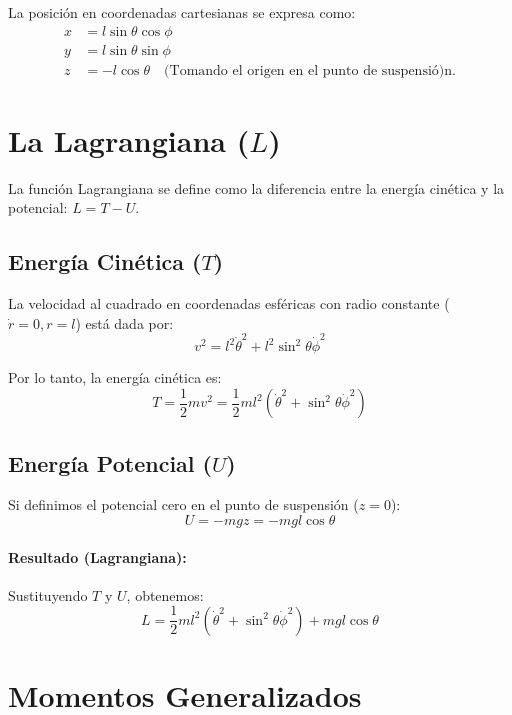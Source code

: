 \documentclass[12pt, a4paper]{article}
\begin{document}
La posición en coordenadas cartesianas se expresa como:
\begin{align}
    x &= l \sin\theta \cos\phi \\
    y &= l \sin\theta \sin\phi \\
    z &= -l \cos\theta \quad \text{(Tomando el origen en el punto de suspensió)n.}
\end{align}

\section*{La Lagrangiana ($L$)}

La función Lagrangiana se define como la diferencia entre la energía cinética y la potencial: $L = T - U$.

\subsection*{Energía Cinética ($T$)}
La velocidad al cuadrado en coordenadas esféricas con radio constante ($\dot{r}=0, r=l$) está dada por:
\begin{equation}
    v^2 = l^2 \dot{\theta}^2 + l^2 \sin^2\theta \dot{\phi}^2
\end{equation}

Por lo tanto, la energía cinética es:
\begin{equation}
    T = \frac{1}{2} m v^2 = \frac{1}{2} m l^2 (\dot{\theta}^2 + \sin^2\theta \dot{\phi}^2)
\end{equation}

\subsection*{Energía Potencial ($U$)}
 Si definimos el potencial cero en el punto de suspensión ($z=0$):
\begin{equation}
    U = -mgz = -mgl \cos\theta
\end{equation}

\paragraph{Resultado (Lagrangiana):}
Sustituyendo $T$ y $U$, obtenemos:
\begin{equation}
    L = \frac{1}{2} m l^2 (\dot{\theta}^2 + \sin^2\theta \dot{\phi}^2) + mgl \cos\theta
\end{equation}

\section*{Momentos Generalizados}
\end{document}
